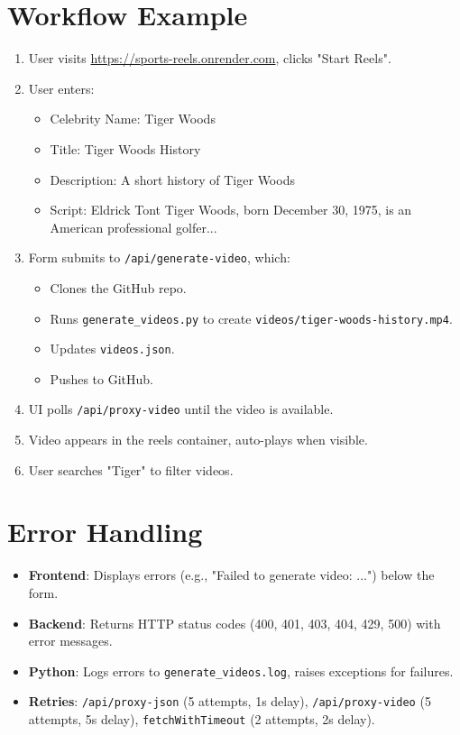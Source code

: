 \documentclass[a4paper,12pt]{article}
\begin{document}
\section{Workflow Example}
\begin{enumerate}
    \item User visits \url{https://sports-reels.onrender.com}, clicks "Start Reels".
    \item User enters:
        \begin{itemize}
            \item Celebrity Name: Tiger Woods
            \item Title: Tiger Woods History
            \item Description: A short history of Tiger Woods
            \item Script: Eldrick Tont Tiger Woods, born December 30, 1975, is an American professional golfer...
        \end{itemize}
    \item Form submits to \texttt{/api/generate-video}, which:
        \begin{itemize}
            \item Clones the GitHub repo.
            \item Runs \texttt{generate\_videos.py} to create \texttt{videos/tiger-woods-history.mp4}.
            \item Updates \texttt{videos.json}.
            \item Pushes to GitHub.
        \end{itemize}
    \item UI polls \texttt{/api/proxy-video} until the video is available.
    \item Video appears in the reels container, auto-plays when visible.
    \item User searches "Tiger" to filter videos.
\end{enumerate}

\section{Error Handling}
\begin{itemize}
    \item \textbf{Frontend}: Displays errors (e.g., "Failed to generate video: ...") below the form.
    \item \textbf{Backend}: Returns HTTP status codes (400, 401, 403, 404, 429, 500) with error messages.
    \item \textbf{Python}: Logs errors to \texttt{generate\_videos.log}, raises exceptions for failures.
    \item \textbf{Retries}: \texttt{/api/proxy-json} (5 attempts, 1s delay), \texttt{/api/proxy-video} (5 attempts, 5s delay), \texttt{fetchWithTimeout} (2 attempts, 2s delay).
\end{itemize}
\end{document}
